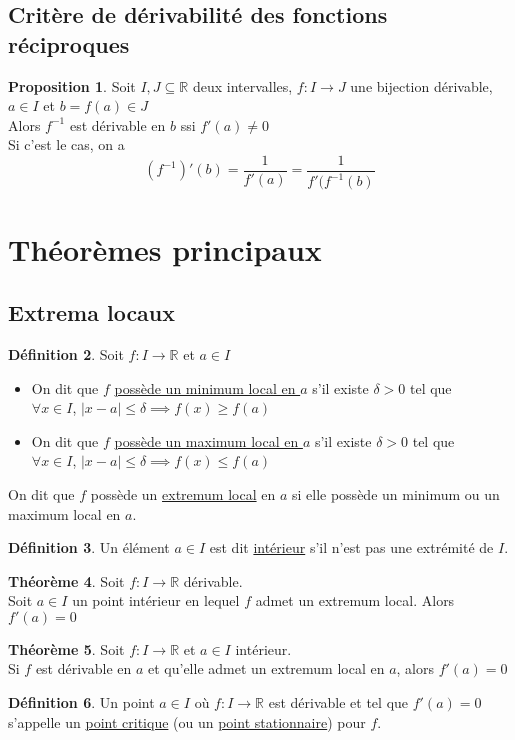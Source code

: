 \documentclass[10pt,a4paper]{article}
\theoremstyle{definition}
\newtheorem{proposition}{Proposition}[section]
\newtheorem{theorem}[proposition]{Théorème}
\newtheorem{definition}[proposition]{Définition}
\begin{document}
\subsection{Critère de dérivabilité des fonctions réciproques}
\begin{proposition}
Soit $I, J \subseteq \mathbb{R}$ deux intervalles, $f: I \to J$ une bijection dérivable, $a \in I$ et $b = f(a) \in J$ \\
Alors $f^{-1}$ est dérivable en $b$ ssi $f'(a) \neq 0$ \\
Si c'est le cas, on a
\[(f^{-1})'(b) = \frac{1}{f'(a)} = \frac{1}{f'(f^{-1}(b)}\]
\end{proposition}

\section{Théorèmes principaux}
\subsection{Extrema locaux}
\begin{definition}
Soit $f: I \to \mathbb{R}$ et $a \in I$
\begin{itemize}
\item On dit que $f$ \uline{possède un minimum local en $a$} s'il existe $\delta > 0$ tel que \\
$\forall x \in I$, $|x - a| \leq \delta \implies f(x) \geq f(a)$
\item On dit que $f$ \uline{possède un maximum local en $a$} s'il existe $\delta > 0$ tel que \\
$\forall x \in I$, $|x - a| \leq \delta \implies f(x) \leq f(a)$
\end{itemize}
On dit que $f$ possède un \uline{extremum local} en $a$ si elle possède un minimum ou un maximum local en $a$.
\end{definition}
\begin{definition}
Un élément $a \in I$ est dit \uline{intérieur} s'il n'est pas une extrémité de $I$.
\end{definition}
\begin{theorem}
Soit $f: I \to \mathbb{R}$ dérivable. \\
Soit $a \in I$ un point intérieur en lequel $f$ admet un extremum local. Alors $f'(a) = 0$ 
\end{theorem}
\begin{theorem}
Soit $f: I \to \mathbb{R}$ et $a \in I$ intérieur. \\
Si $f$ est dérivable en $a$ et qu'elle admet un extremum local en $a$, alors $f'(a) = 0$
\end{theorem}
\begin{definition}
Un point $a \in I$ où $f: I \to \mathbb{R}$ est dérivable et tel que $f'(a) = 0$ s'appelle un \uline{point critique} (ou un \uline{point stationnaire}) pour $f$.
\end{definition}
\end{document}

